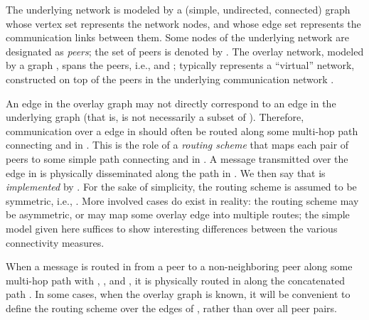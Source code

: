 \LongVersion \documentclass[11pt]{article}
\theoremstyle{definition}
\theoremstyle{plain}
\begin{document}
The underlying network is modeled by a (simple, undirected, connected)
graph  whose vertex set  represents the network nodes,
and whose edge set  represents the communication links between them.
Some nodes of the underlying network are designated as \emph{peers};
the set of peers is denoted by .
The overlay network, modeled by a graph , spans the peers, i.e.,
 and ;
 typically represents a ``virtual'' network, constructed on top of
the peers in the underlying communication network .

An edge  in the overlay graph  may not directly correspond to an
edge in the underlying graph  (that is,  is not necessarily a
subset of ).
Therefore, communication over a  edge in  should
often be routed along some multi-hop path connecting  and  in .
This is the role of a \emph{routing scheme}  that maps each pair  of peers to some
simple path  connecting  and  in .
A message transmitted over the edge  in  is physically disseminated
along the path  in .
We then say that  is \emph{implemented} by .
For the sake of simplicity, the routing scheme  is assumed to be
symmetric, i.e., .
More involved cases do exist in reality:
the routing scheme may be asymmetric, or may map some overlay edge into
multiple routes;
the simple model given here suffices to show interesting differences between
the various connectivity measures.

When a message is routed in  from a peer  to a
non-neighboring peer  along some multi-hop path  with , , and , it is
physically routed in  along the concatenated path .
In some cases, when the overlay graph  is known, it will be convenient to
define the routing scheme over the edges of , rather than over all peer
pairs.
\end{document}
